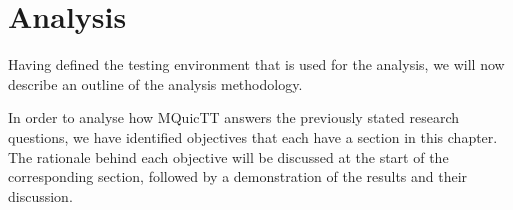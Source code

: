 \chapter{Analysis} \label{chapter:eval}

Having defined the testing environment that is used for the analysis, we will now describe an outline of the analysis methodology.

In order to analyse how MQuicTT answers the previously stated research questions, we have identified objectives that each have a section in this chapter.
The rationale behind each objective will be discussed at the start of the corresponding section, followed by a demonstration of the results and their discussion.



